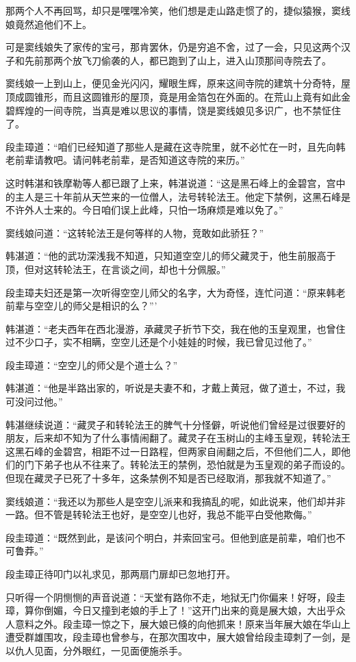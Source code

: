 \documentclass[12pt,oneside]{book}
\begin{document}
那两个人不再回骂，却只是嘿嘿冷笑，他们想是走山路走惯了的，捷似猿猴，窦线娘竟然追他们不上。

可是窦线娘失了家传的宝弓，那肯罢休，仍是穷追不舍，过了一会，只见这两个汉子和先前那两个放飞刀偷袭的人，都已跑到了山上，进入山顶那间寺院去了。

窦线娘一上到山上，便见金光闪闪，耀眼生辉，原来这间寺院的建筑十分奇特，屋顶成圆锥形，而且这圆锥形的屋顶，竟是用金箔包在外面的。在荒山上竟有如此金碧辉煌的一间寺院，当真是难以思议的事情，饶是窦线娘见多识广，也不禁怔住了。

段圭璋道：``咱们已经知道了那些人是藏在这寺院里，就不必忙在一时，且先向韩老前辈请教吧。请问韩老前辈，是否知道这寺院的来历。''

这时韩湛和铁摩勒等人都已跟了上来，韩湛说道：``这是黑石峰上的金碧宫，宫中的主人是三十年前从天竺来的一位僧人，法号转轮法王。他定下禁例，这黑石峰是不许外人士来的。今日咱们误上此峰，只怕一场麻烦是难以免了。''

窦线娘问道：``这转轮法王是何等样的人物，竞敢如此骄狂？''

韩湛道：``他的武功深浅我不知道，只知道空空儿的师父藏灵于，他生前服高于顶，但对这转轮法王，在言谈之间，却也十分佩服。''

段圭璋夫妇还是第一次听得空空儿师父的名字，大为奇怪，连忙问道：``原来韩老前辈与空空儿的师父是相识的么？'''

韩湛道：``老夫西年在西北漫游，承藏灵子折节下交，我在他的玉皇观里，也曾住过不少口子，实不相瞒，空空儿还是个小娃娃的时候，我已曾见过他了。''

段圭璋道：``空空儿的师父是个道士么？''

韩湛道：``他是半路出家的，听说是夫妻不和，才戴上黄冠，做了道士，不过，我可没问过他。''

韩湛继续说道：``藏灵子和转轮法王的脾气十分怪僻，听说他们曾经是过很要好的朋友，后来却不知为了什么事情闹翻了。藏灵子在玉树山的主峰玉皇观，转轮法王这黑石峰的金碧宫，相距不过一日路程，但两家自闹翻之后，不但他们二人，即他们的门下弟子也从不往来了。转轮法王的禁例，恐怕就是为玉皇观的弟子而设的。但现在藏灵子已死了十多年，这条禁例不知是否已经取消，那我就不知道了。''

窦线娘道：``我还以为那些人是空空儿派来和我搞乱的呢，如此说来，他们却并非一路。但不管是转轮法王也好，是空空儿也好，我总不能平白受他欺侮。''

段圭璋道：``既然到此，是该问个明白，并索回宝弓。但他到底是前辈，咱们也不可鲁莽。''

段圭璋正待叩门以礼求见，那两扇门扉却已忽地打开。

只听得一个阴恻恻的声音说道：``天堂有路你不走，地狱无门你偏来！好呀，段圭璋，算你倒媚，今日又撞到老娘的手上了！''这开门出来的竟是展大娘，大出乎众人意料之外。段圭璋一惊之下，展大娘已倏的向他抓来！原来当年展大娘在华山上遭受群雄围攻，段圭璋也曾参与，在那次围攻中，展大娘曾给段圭璋刺了一剑，是以仇人见面，分外眼红，一见面便施杀手。
\end{document}
